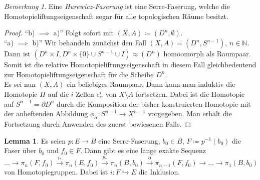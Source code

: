 \documentclass[11pt, a4paper, german]{article}
\theoremstyle{definition}
\newtheorem*{lem}{Lemma}
\theoremstyle{remark}
\newtheorem*{bem}{Bemerkung}
\newcommand{\N}{\mathbb{N}} %
\newcommand{\ES}{Es sei} %
\newcommand{\ESn}{Es seien} %
\newcommand{\I}{I} %
\begin{document}
\begin{bem}
  Eine \emph{Hurewicz-Faserung} ist eine Serre-Faserung, welche die Homotopieliftungseigenschaft sogar für alle topologischen Räume besitzt.
\end{bem}

\begin{proof}
  "`b) $\implies$ a)"' \enspace Folgt sofort mit $(X, A) \coloneqq (D^n, \emptyset)$. \\[2pt]
  "`a) $\implies$ b)"' \enspace Wir behandeln zunächst den Fall $(X, A) = (D^n, S^{n-1})$, $n \in \N$. Dann ist $(D^n \times \I, D^n \times \{ 0 \} \cup S^{n-1} \cup \I) \approx (D^n)$ homöomorph als Raumpaar.
  Somit ist die relative Homotopieliftungseigenschaft in diesem Fall gleichbedeutend zur Homotopieliftungseigenschaft für die Scheibe $D^n$. \\
  \ES{} nun $(X, A)$ ein beliebiges Raumpaar.
  Dann kann man induktiv die Homotopie $H$ auf die $i$-Zellen $e^i_\alpha$ von $X \setminus A$ fortsetzen.
  Dabei ist die Homotopie auf $S^{n-1} = \partial D^n$ durch die Komposition der bisher konstruierten Homotopie mit der anheftenden Abbildung $\phi_\alpha : S^{n-1} \to X^{n-1}$ vorgegeben.
  Man erhält die Fortsetzung durch Anwenden des zuerst bewiesenen Falls.
\end{proof}

\begin{lem}
  \ESn{} $p : E \to B$ eine Serre-Faserung, $b_0 \in B$, $F \coloneqq p^{-1}(b_0)$ die Faser über $b_0$ und $f_0 \in F$.
  Dann gibt es eine lange exakte Sequenz
  \[ \ldots \to \pi_n(F, f_0) \xrightarrow{i_*} \pi_n(E, f_0) \xrightarrow{p_*} \pi_n(B, b_0) \xrightarrow{\partial} \pi_{n-1}(F, f_0) \to \ldots \to \pi_1(B, b_0) \]
  von Homotopiegruppen.
  Dabei ist $i : F \hookrightarrow E$ die Inklusion.
\end{lem}
\end{document}
